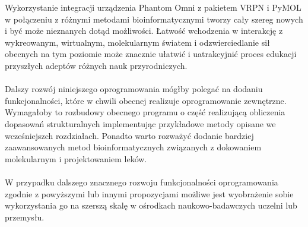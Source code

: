 \documentclass[licencjacka]{pracamgr}
\begin{document}
Wykorzystanie integracji urządzenia Phantom Omni z pakietem VRPN i PyMOL w połączeniu z różnymi metodami bioinformatycznymi tworzy cały szereg nowych i być może nieznanych dotąd możliwości. Łatwość wchodzenia w interakcję z wykreowanym, wirtualnym, molekularnym światem i odzwierciedlanie sił obecnych na tym poziomie może znacznie ułatwić i uatrakcyjnić proces edukacji przyszłych adeptów różnych nauk przyrodniczych.
\\
\\
Dalszy rozwój niniejszego oprogramowania mógłby polegać na dodaniu funkcjonalności, które w chwili obecnej realizuje oprogramowanie zewnętrzne. Wymagałoby to rozbudowy obecnego programu o część realizującą obliczenia dopasowań strukturalnych implementując przykładowe metody opisane we wcześniejszch rozdziałach. Ponadto warto rozważyć dodanie bardziej zaawansowanych metod bioinformatycznych związanych z dokowaniem molekularnym i projektowaniem leków.
\\
\\
W przypadku dalszego znacznego rozwoju funkcjonalności oprogramowania zgodnie z powyższymi lub innymi propozycjami możliwe jest wyobrażenie sobie wykorzystania go na szerszą skalę w ośrodkach naukowo-badawczych uczelni lub przemysłu.
\\
\\
\end{document}
